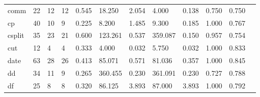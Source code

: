 \begin{longtable}{lp{1.00cm}p{1.00cm}p{1.00cm}p{1.00cm}p{1.00cm}p{1.00cm}p{1.00cm}p{1.00cm}p{1.00cm}p{1.00cm}p{1.00cm}}
comm      &                           22 &                 12 &                                12 &                                      0.545 &                                 18.250 &                                        2.054 &                             4.000 &                                   0.138 &                        0.750 &                                        0.750 \\
cp        &                           40 &                 10 &                                 9 &                                      0.225 &                                  8.200 &                                        1.485 &                             9.300 &                                   0.185 &                        1.000 &                                        0.767 \\
csplit    &                           35 &                 23 &                                21 &                                      0.600 &                                123.261 &                                        0.537 &                           359.087 &                                   0.150 &                        0.957 &                                        0.754 \\
cut       &                           12 &                  4 &                                 4 &                                      0.333 &                                  4.000 &                                        0.032 &                             5.750 &                                   0.032 &                        1.000 &                                        0.833 \\
date      &                           63 &                 28 &                                26 &                                      0.413 &                                 85.071 &                                        0.571 &                            81.036 &                                   0.357 &                        1.000 &                                        0.845 \\
dd        &                           34 &                 11 &                                 9 &                                      0.265 &                                360.455 &                                        0.230 &                           361.091 &                                   0.230 &                        0.727 &                                        0.788 \\
df        &                           25 &                  8 &                                 8 &                                      0.320 &                                 86.125 &                                        3.893 &                            87.000 &                                   3.893 &                        1.000 &                                        0.792 \\

\end{longtable}

